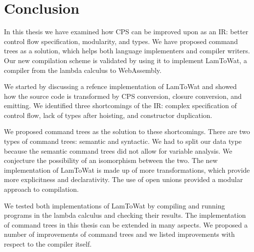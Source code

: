 \chapter{\label{chap:conclusion}Conclusion}

In this thesis we have examined how CPS can be improved upon as an IR: better control flow specification, modularity, and types. We have proposed command trees as a solution, which helps both language implementers and compiler writers. Our new compilation scheme is validated by using it to implement LamToWat, a compiler from the lambda calculus to WebAssembly.

We started by discussing a refence implementation of LamToWat and showed how the source code is transformed by CPS conversion, closure conversion, and emitting. We identified three shortcomings of the IR: complex specification of control flow, lack of types after hoisting, and constructor duplication.

We proposed command trees as the solution to these shortcomings. There are two types of command trees: semantic and syntactic. We had to split our data type because the semantic command trees did not allow for variable analysis. We conjecture the possibility of an isomorphism between the two. The new implementation of LamToWat is made up of more transformations, which provide more explicitness and declarativity. The use of open unions provided a modular approach to compilation.

We tested both implementations of LamToWat by compiling and running programs in the lambda calculus and checking their results. The implementation of command trees in this thesis can be extended in many aspects. We proposed a number of improvements of command trees and we listed improvements with respect to the compiler itself.